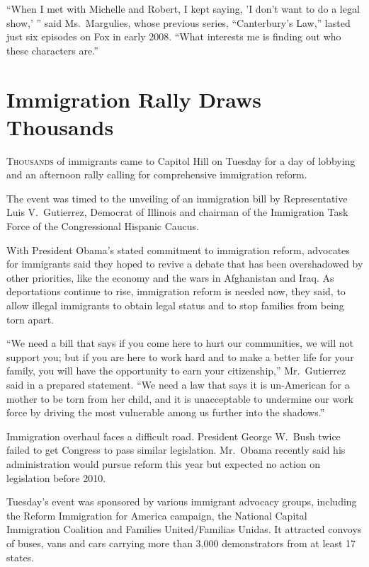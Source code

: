 ﻿\documentclass[12pt]{article}
\begin{document}
``When I met with Michelle and Robert, I kept saying, 'I don't want to do a legal show,' '' said
Ms.~Margulies, whose previous series, ``Canterbury's Law,'' lasted just six episodes on Fox in early
2008. ``What interests me is finding out who these characters are.''

\section{Immigration Rally Draws Thousands}

\lettrine{T}{housands} of immigrants came to Capitol Hill on Tuesday for a
day of lobbying and an afternoon rally calling for comprehensive immigration reform.

The event was timed to the unveiling of an immigration bill by Representative Luis V.~Gutierrez,
Democrat of Illinois and chairman of the Immigration Task Force of the Congressional Hispanic
Caucus.

With President Obama's stated commitment to immigration reform, advocates for immigrants said they
hoped to revive a debate that has been overshadowed by other priorities, like the economy and the
wars in Afghanistan and Iraq. As deportations continue to rise, immigration reform is needed now,
they said, to allow illegal immigrants to obtain legal status and to stop families from being torn
apart.

``We need a bill that says if you come here to hurt our communities, we will not support you; but if
you are here to work hard and to make a better life for your family, you will have the opportunity
to earn your citizenship,'' Mr.~Gutierrez said in a prepared statement. ``We need a law that says it
is un-American for a mother to be torn from her child, and it is unacceptable to undermine our work
force by driving the most vulnerable among us further into the shadows.''

Immigration overhaul faces a difficult road. President George W.~Bush twice failed to get Congress
to pass similar legislation. Mr.~Obama recently said his administration would pursue reform this
year but expected no action on legislation before 2010.

Tuesday's event was sponsored by various immigrant advocacy groups, including the Reform Immigration
for America campaign, the National Capital Immigration Coalition and Families United/Familias
Unidas. It attracted convoys of buses, vans and cars carrying more than 3,000 demonstrators from at
least 17 states.
\end{document}
